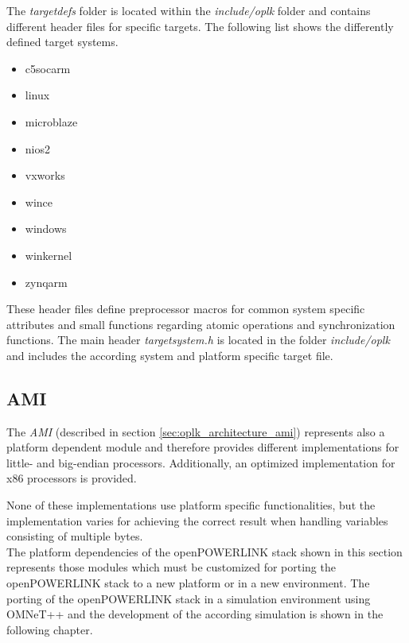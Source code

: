 \begin{description}[leftmargin=1cm]
    \item[targetdefs] The \emph{targetdefs} folder is located within the \emph{include/oplk} folder and contains different header files for specific targets.
    The following list shows the differently defined target systems.
    \begin{multicols}{3}
        \begin{itemize}
            \item c5socarm
            \item linux
            \item microblaze
            \item nios2
            \item vxworks
            \item wince
            \item windows
            \item winkernel
            \item zynqarm
        \end{itemize}
    \end{multicols}
    These header files define preprocessor macros for common system specific attributes and small functions regarding atomic operations and synchronization functions.
    The main header \emph{targetsystem.h} is located in the folder \emph{include/oplk} and includes the according system and platform specific target file. \\
    
        
\end{description}

\subsection{AMI}
\label{sec:oplk_platform_ami}

The \emph{AMI} (described in section \ref{sec:oplk_architecture_ami}) represents also a platform dependent module and therefore provides different implementations for little- and big-endian processors.
Additionally, an optimized implementation for x86 processors is provided.

None of these implementations use platform specific functionalities, but the implementation varies for achieving the correct result when handling variables consisting of multiple bytes.
\\

The platform dependencies of the openPOWERLINK stack shown in this section represents those modules which must be customized for porting the openPOWERLINK stack to a new platform or in a new environment.
The porting of the openPOWERLINK stack in a simulation environment using OMNeT++ and the development of the according simulation is shown in the following chapter.